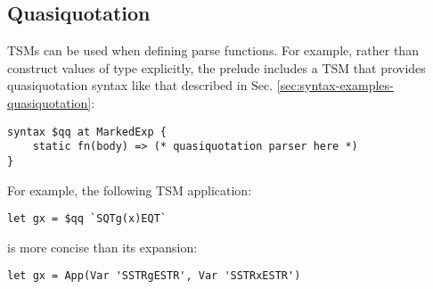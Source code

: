 \subsection{Quasiquotation}
TSMs can be used when defining parse functions. For example, rather than construct values of type  explicitly, the prelude includes a TSM that provides quasiquotation syntax like that described in Sec. \ref{sec:syntax-examples-quasiquotation}:
\begin{lstlisting}[numbers=none]
syntax $qq at MarkedExp {
	static fn(body) => (* quasiquotation parser here *)
}
\end{lstlisting}
For example, the following TSM application:
\begin{lstlisting}[numbers=none]
let gx = $qq `SQTg(x)EQT`
\end{lstlisting}
is more concise than its expansion:
\begin{lstlisting}[numbers=none]
let gx = App(Var 'SSTRgESTR', Var 'SSTRxESTR')
\end{lstlisting}

